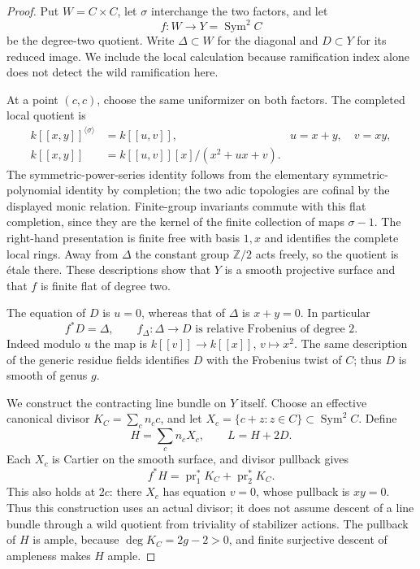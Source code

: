 \begin{proof}
Put $W=C\times C$, let $\sigma$ interchange the two factors, and let
\[
       f:W\longrightarrow Y=\operatorname{Sym}^2 C
                                                        \tag{D.WS.2}
\]
be the degree-two quotient. Write $\Delta\subset W$ for the diagonal
and $D\subset Y$ for its reduced image. We include the local
calculation because ramification index alone does not detect the
wild ramification here.

At a point $(c,c)$, choose the same uniformizer on both factors.
The completed local quotient is
\[
 \begin{aligned}
 k[[x,y]]^{\langle\sigma\rangle}&=k[[u,v]],
       &u=x+y,\quad v=xy,\\
 k[[x,y]]&=k[[u,v]][x]/(x^2+ux+v).
 \end{aligned}                                           \tag{D.WS.3}
\]
The symmetric-power-series identity follows from the elementary
symmetric-polynomial identity by completion; the two adic topologies
are cofinal by the displayed monic relation. Finite-group invariants
commute with this flat completion, since they are the kernel of the
finite collection of maps $\sigma-1$. The right-hand presentation is
finite free with basis $1,x$ and identifies the complete local rings.
Away from $\Delta$ the constant group $\mathbb Z/2$ acts freely, so
the quotient is \'etale there. These descriptions show that $Y$ is a
smooth projective surface and that $f$ is finite flat of degree two.

The equation of $D$ is $u=0$, whereas that of $\Delta$ is $x+y=0$.
In particular
\[
       f^*D=\Delta,\qquad
       f_\Delta:\Delta\longrightarrow D
       \text{ is relative Frobenius of degree }2.
                                                        \tag{D.WS.4}
\]
Indeed modulo $u$ the map is $k[[v]]\to k[[x]]$, $v\mapsto x^2$.
The same description of the generic residue fields identifies $D$
with the Frobenius twist of $C$; thus $D$ is smooth of genus $g$.

We construct the contracting line bundle on $Y$ itself. Choose an
effective canonical divisor $K_C=\sum_c n_c c$, and let
$X_c=\{c+z:z\in C\}\subset\operatorname{Sym}^2C$. Define
\[
                  H=\sum_c n_c X_c,\qquad L=H+2D.
                                                        \tag{D.WS.5}
\]
Each $X_c$ is Cartier on the smooth surface, and divisor pullback gives
\[
            f^*H=\operatorname{pr}_1^*K_C+
                         \operatorname{pr}_2^*K_C.
                                                        \tag{D.WS.6}
\]
This also holds at $2c$: there $X_c$ has equation $v=0$, whose
pullback is $xy=0$. Thus this construction uses an actual divisor;
it does not assume descent of a line bundle through a wild quotient
from triviality of stabilizer actions. The pullback of $H$ is ample,
because $\deg K_C=2g-2>0$, and finite surjective descent of ampleness
makes $H$ ample.


\end{proof}
